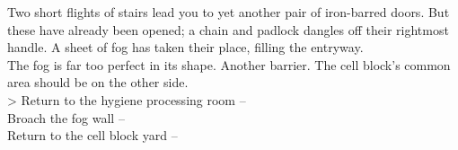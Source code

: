 Two short flights of stairs lead you to yet another pair of iron-barred doors. But these have already been opened; a chain and padlock dangles off their rightmost handle. A sheet of fog has taken their place, filling the entryway.\\

The fog is far too perfect in its shape. Another barrier. The cell block’s common area should be on the other side.\\

> Return to the hygiene processing room -- \\
 Broach the fog wall -- \\
 Return to the cell block yard -- 